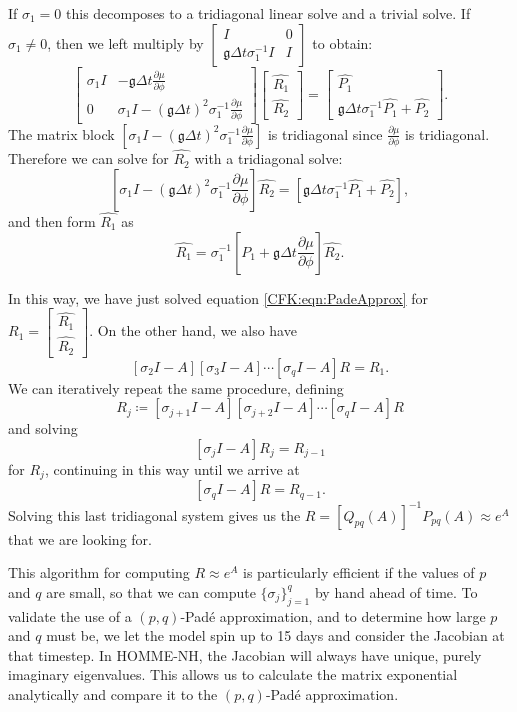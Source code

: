 \documentclass{csri19}
\newcommand{\CFKg}{\mathfrak{g}}
\begin{document}
If $\sigma_1 = 0$ this decomposes to a tridiagonal linear solve and a trivial solve. 
If $\sigma_1 \neq 0$, then we left multiply by $\begin{bmatrix} I & 0 \\
                                     \CFKg\Delta t \sigma_1^{-1}I & I \end{bmatrix}$ to obtain:
\[\begin{bmatrix} 
 \sigma_1 I  & -\CFKg\Delta t \frac{\partial\mu}{\partial\phi} \\
         0 & \sigma_1 I -\left(\CFKg\Delta t\right)^2  \sigma_1^{-1}\frac{\partial\mu}{\partial\phi}
 \end{bmatrix}
 \begin{bmatrix} \hat{R_1} \\
 \hat{R_2} \end{bmatrix} = 
\begin{bmatrix} \hat{P_1} \\
 \CFKg\Delta t \sigma_1^{-1} \hat{P_1} +  \hat{P_2} \end{bmatrix}.\]
The matrix block $\left[\sigma_1 I -\left(\CFKg\Delta t\right)^2\sigma_1^{-1}\frac{\partial\mu}{\partial\phi}\right]$ 
is tridiagonal since $\frac{\partial\mu}{\partial\phi}$ is tridiagonal. 
Therefore we can solve for $\hat{R_2}$ with a tridiagonal 
solve:
\[\left[\sigma_1 I -\left(\CFKg\Delta t \right)^2  \sigma_1^{-1}\frac{\partial\mu}{\partial\phi}\right]\hat{R_2}
 = \left[\CFKg\Delta t\sigma_1^{-1} \hat{P_1} +  \hat{P_2}\right],\]
and then form $\hat{R_1}$ as 
\[\hat{R_1} = \sigma_1^{-1}\left[P_1 + \CFKg\Delta t\frac{\partial \mu}{\partial \phi}\right] \hat{R_2}.\]

In this way, we have just solved equation \ref{CFK:eqn:PadeApprox} for $R_1 = \begin{bmatrix} \hat{R_1}\\ \hat{R_2}\end{bmatrix}$. 
On the other hand, we also have
\[\left[\sigma_2I-A\right]\left[\sigma_3I-A\right]\cdots\left[\sigma_qI-A\right]R = R_1.\] 
We can iteratively repeat the same procedure, defining 
\[R_j \coloneqq \left[\sigma_{j+1}I-A\right]\left[\sigma_{j+2}I-A\right]\cdots\left[\sigma_qI-A\right]R\]
 and solving 
\[\left[\sigma_jI-A\right]R_j = R_{j-1}\] for $R_j$, continuing 
in this way until we arrive at \[\left[\sigma_qI-A\right]R = R_{q-1}.\] 
Solving this last tridiagonal system gives us the $R = \left[Q_{pq}(A)\right]^{-1}P_{pq}(A)\approx e^A$
 that we are looking for.

This algorithm for computing $R \approx e^A$ is particularly efficient if 
the values of $p$ and $q$ are small, so that we can compute $\{\sigma_j\}_
{j=1}^q$ by hand ahead of time. To validate the use of a $(p,q)$-Pad\'e 
approximation, and to determine how large $p$ and $q$ must be, we let the 
model spin up to 15 days and consider the Jacobian at that timestep. In 
HOMME-NH, the Jacobian will always have unique, purely imaginary 
eigenvalues. This allows us to calculate the matrix exponential 
analytically and compare it to the $(p,q)$-Pad\'e approximation.
\end{document}
